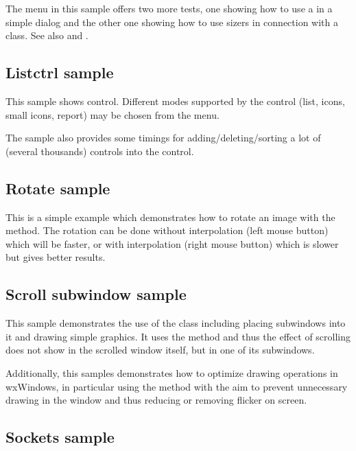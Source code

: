 The menu in this sample offers two more tests, one showing how to use
a  in a simple dialog and the other one
showing how to use sizers in connection with a  
class. See also  and 
.

\subsection{Listctrl sample}\label{samplelistctrl}

This sample shows  control. Different modes
supported by the control (list, icons, small icons, report) may be chosen from
the menu.

The sample also provides some timings for adding/deleting/sorting a lot of
(several thousands) controls into the control.

\subsection{Rotate sample}\label{samplerotate}

This is a simple example which demonstrates how to rotate an image with
the  method. The rotation can
be done without interpolation (left mouse button) which will be faster,
or with interpolation (right mouse button) which is slower but gives
better results.

\subsection{Scroll subwindow sample}\label{samplescrollsub}

This sample demonstrates the use of the  
class including placing subwindows into it and drawing simple graphics. It uses the 
 method and thus the effect
of scrolling does not show in the scrolled window itself, but in one of its subwindows.

Additionally, this samples demonstrates how to optimize drawing operations in wxWindows,
in particular using the  method with 
the aim to prevent unnecessary drawing in the window and thus reducing or removing 
flicker on screen.

\subsection{Sockets sample}\label{samplesockets}

